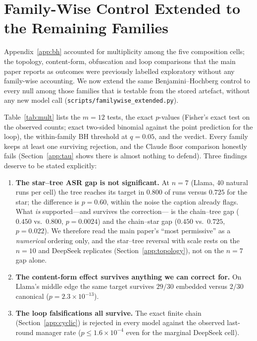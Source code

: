 \documentclass[sigconf,anonymous]{aamas}
\begin{document}
\section{Family-Wise Control Extended to the Remaining Families}
\label{app:mult}

Appendix~\ref{app:bh} accounted for multiplicity among the five composition
cells; the topology, content-form, obfuscation and loop comparisons that the main
paper reports as outcomes were previously labelled exploratory without any
family-wise accounting. We now extend the same Benjamini--Hochberg control to
every null among those families that is testable from the stored artefact,
without any new model call (\texttt{scripts/familywise\_extended.py}).

Table~\ref{tab:mult} lists the $m = 12$ tests, the exact $p$-values (Fisher's
exact test on the observed counts; exact two-sided binomial against the
point prediction for the loop), the within-family BH threshold at $q = 0.05$,
and the verdict. Every family keeps at least one surviving rejection, and the
Claude floor comparison honestly fails (Section~\ref{app:tau} shows there is
almost nothing to defend). Three findings deserve to be stated explicitly:

\begin{enumerate}
  \item \textbf{The star--tree ASR gap is not significant.} At $n = 7$ (Llama,
  40 natural runs per cell) the tree reaches its target in $0.800$ of runs
  versus $0.725$ for the star; the difference is $p = 0.60$, within the noise the
  caption already flags. What \emph{is} supported---and survives the correction---
  is the chain--tree gap ($0.450$ vs.\ $0.800$, $p = 0.0024$) and the
  chain--star gap ($0.450$ vs.\ $0.725$, $p = 0.022$). We therefore read the
  main paper's ``most permissive'' as a \emph{numerical} ordering only, and the
  star--tree reversal with scale rests on the $n = 10$ and DeepSeek replicates
  (Section~\ref{app:topology}), not on the $n = 7$ gap alone.
  \item \textbf{The content-form effect survives anything we can correct for.}
  On Llama's middle edge the same target survives $29/30$ embedded versus
  $2/30$ canonical ($p = 2.3 \times 10^{-13}$).
  \item \textbf{The loop falsifications all survive.} The exact finite chain
  (Section~\ref{app:cyclic}) is rejected in every model against the observed
  last-round manager rate ($p \le 1.6\times 10^{-4}$ even for the marginal
  DeepSeek cell).
\end{enumerate}
\end{document}
